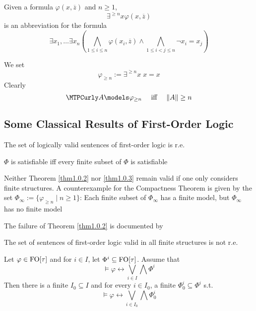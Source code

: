 \documentclass[11pt]{article}
\begin{document}
Given a formula \(\varphi(x,\overbar{z})\) and \(n\ge1\),
\begin{equation*}
\exists^{\ge n}x\varphi(x,\overbar{z})
\end{equation*}
is an abbreviation for the formula
\begin{equation*}
\exists x_1,\dots\exists x_n(
\bigwedge_{1\le i\le n}\varphi(x_i,\overbar{z})\wedge
\bigwedge_{1\le i<j\le n}\neg x_i=x_j)
\end{equation*}

We set
\begin{equation*}
\varphi_{\ge n}:=\exists^{\ge n}x\;x=x
\end{equation*}
Clearly
\begin{equation*}
\cala\models\varphi_{\ge n}\quad\text{ iff }\quad\norm{A}\ge n
\end{equation*}

\subsection{Some Classical Results of First-Order Logic}
\label{sec:org14a6b13}
\begin{theorem}[]
\label{thm1.0.2}
The set of logically valid sentences of first-order logic is r.e.
\end{theorem}
\begin{theorem}
\label{thm1.0.3}
\(\Phi\) is satisfiable iff every finite subset of \(\Phi\) is satisfiable
\end{theorem}

Neither Theorem \ref{thm1.0.2} nor \ref{thm1.0.3} remain valid if one only
considers finite structures. A counterexample for the Compactness Theorem is
given by the set \(\Phi_\infty:=\{\varphi_{\ge n}\mid n\ge1\}\): Each finite
subset of \(\Phi_\infty\) has a finite model, but \(\Phi_\infty\) has no
finite model

The failure of Theorem \ref{thm1.0.2} is documented by
\begin{theorem}
The set of sentences of first-order logic valid in all finite structures is
not r.e.
\end{theorem}

\begin{lemma}[]
Let \(\varphi\in\operatorname{FO}[\tau]\) and for \(i\in I\), let
\(\Phi^i\subseteq\operatorname{FO}[\tau]\). Assume that
\begin{equation*}
\models\varphi\leftrightarrow\bigvee_{i\in I}\bigwedge\Phi^i
\end{equation*}
Then there is a finite \(I_0\subseteq I\) and for every \(i\in I_0\), a
finite \(\Phi^i_0\subseteq\Phi^i\) s.t.
\begin{equation*}
\models\varphi\leftrightarrow\bigvee_{i\in I_0}\bigwedge\Phi^i_0
\end{equation*}
\end{lemma}
\end{document}

